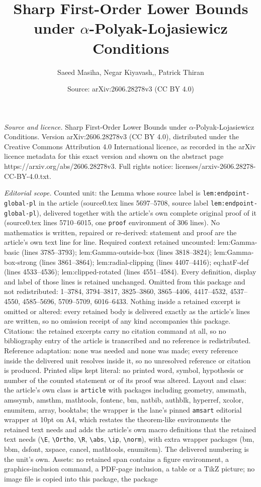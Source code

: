 \documentclass[10pt,a4paper]{amsart}
\title[Sharp First-Order Lower Bounds under $\alpha$-Polyak-Lojasie]{Sharp First-Order Lower Bounds under $\alpha$-Polyak-Lojasiewicz Conditions}
\author{Saeed Masiha, Negar Kiyavash,, Patrick Thiran}
\date{Source: arXiv:2606.28278v3 (CC BY 4.0)}
\begin{document}
\maketitle

\noindent\emph{Source and licence.} Sharp First-Order Lower Bounds under $\alpha$-Polyak-Lojasiewicz Conditions. Version arXiv:2606.28278v3 (CC BY 4.0), distributed under the Creative Commons Attribution 4.0 International licence, as recorded in the arXiv licence metadata for this exact version and shown on the abstract page https://arxiv.org/abs/2606.28278v3. Full rights notice: licenses/arxiv-2606.28278-CC-BY-4.0.txt.\par\smallskip

\noindent\textit{Editorial scope.} Counted unit: the Lemma whose source label is \texttt{lem:endpoint-global-pl} in the article (source0.tex lines 5697--5708, source label \texttt{lem:endpoint-global-pl}), delivered together with the article's own complete original proof of it (source0.tex lines 5710--6015, one \texttt{proof} environment of 306 lines). No mathematics is written, repaired or re-derived: statement and proof are the article's own text line for line. Required context retained uncounted: lem:Gamma-basic (lines 3785--3793); lem:Gamma-outside-box (lines 3818--3824); lem:Gamma-box-strong (lines 3861--3864); lem:radial-clipping (lines 4407--4416); eq:hatF-def (lines 4533--4536); lem:clipped-rotated (lines 4551--4584). Every definition, display and label of those lines is retained unchanged. Omitted from this package and not redistributed: 1--3784, 3794--3817, 3825--3860, 3865--4406, 4417--4532, 4537--4550, 4585--5696, 5709--5709, 6016--6433. Nothing inside a retained excerpt is omitted or altered: every retained body is delivered exactly as the article's lines are written, so no omission receipt of any kind accompanies this package. Citations: the retained excerpts carry no citation command at all, so no bibliography entry of the article is transcribed and no reference is redistributed. Reference adaptation: none was needed and none was made; every reference inside the delivered unit resolves inside it, so no unresolved reference or citation is produced. Printed slips kept literal: no printed word, symbol, hypothesis or number of the counted statement or of its proof was altered. Layout and class: the article's own class is \texttt{article} with packages including geometry, amsmath, amssymb, amsthm, mathtools, fontenc, bm, natbib, authblk, hyperref, xcolor, enumitem, array, booktabs; the wrapper is the lane's pinned \texttt{amsart} editorial wrapper at 10pt on A4, which restates the theorem-like environments the retained text needs and adds the article's own macro definitions that the retained text needs (\texttt{\textbackslash E}, \texttt{\textbackslash Ortho}, \texttt{\textbackslash R}, \texttt{\textbackslash abs}, \texttt{\textbackslash ip}, \texttt{\textbackslash norm}), with extra wrapper packages (bm, bbm, dsfont, xspace, cancel, mathtools, enumitem). The delivered numbering is the unit's own. Assets: no retained span contains a figure environment, a graphics-inclusion command, a PDF-page inclusion, a table or a TikZ picture; no image file is copied into this package, the package 
\end{document}
